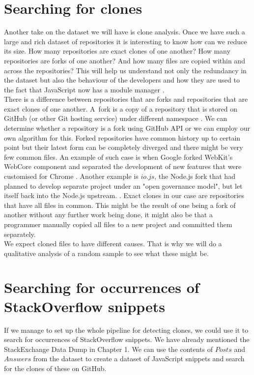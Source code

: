 \documentclass[thesis=M,english]{FITthesis}[2012/10/20]
\begin{document}
\section{Searching for clones}

Another take on the dataset we will have is clone analysis. Once we have such a large and rich dataset of repositories it is interesting to know how can we reduce its size. How many repositories are exact clones of one another? How many repositories are forks of one another? And how many files are copied within and across the repositories? This will help us understand not only the redundancy in the dataset but also the behaviour of the developers and how they are used to the fact that JavaScript now has a module manager \cite{npm}. \\

There is a difference between repositories that are forks and repositories that are exact clones of one another. A~fork is a copy of a repository that is stored on GitHub (or other Git hosting service) under different namespace \cite{gh_forks}. We can determine whether a repository is a fork using GitHub API or we can employ our own algorithm for this.  Forked repositories have common history up to certain point but their latest form can be completely diverged and there might be very few common files. An example of such case is when Google forked WebKit's WebCore component and separated the development of new features that were customised for Chrome \cite{blink}. Another example is $io.js$, the Node.js fork that had planned to develop separate project under an "open governance model", but let itself back into the Node.js upstream. \cite{iojs, iojs2, iojs3}. Exact clones in our case are repositories that have all files in common. This might be the result of one being a fork of another without any further work being done, it might also be that a programmer manually copied all files to a new project and committed them separately. \\

We expect cloned files to have different causes. That is why we will do a qualitative analysis of a random sample to see what these might be. \\

\section{Searching for occurrences of StackOverflow snippets}

If we manage to set up the whole pipeline for detecting clones, we could use it to search for occurrences of StackOverflow snippets. We have already mentioned the StackExchange Data Dump in Chapter 1. We can use the contents of $Posts$ and $Answers$ from the dataset to create a dataset of JavaScript snippets and search for the clones of these on GitHub.
\end{document}
